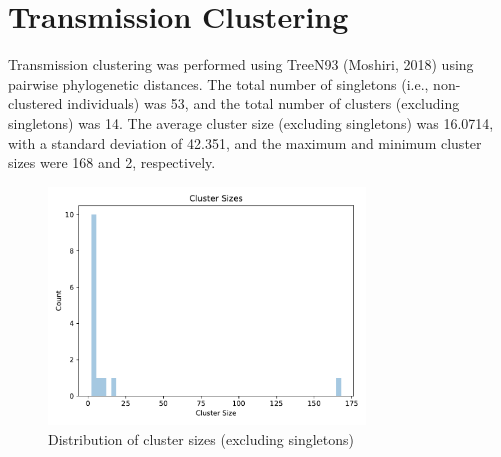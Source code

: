 \documentclass{article}
\begin{document}
\section{Transmission Clustering}
Transmission clustering was performed using TreeN93 (Moshiri, 2018) using pairwise phylogenetic distances.
The total number of singletons (i.e., non-clustered individuals) was 53,
and the total number of clusters (excluding singletons) was 14.
The average cluster size (excluding singletons) was 16.0714,
with a standard deviation of 42.351,
and the maximum and minimum cluster sizes were 168 and 2, respectively.


\begin{figure}[h]
\centering
\includegraphics[width=0.75\textwidth,keepaspectratio]{./figs/cluster_sizes.pdf}
\caption{Distribution of cluster sizes (excluding singletons)}
\end{figure}
\end{document}
